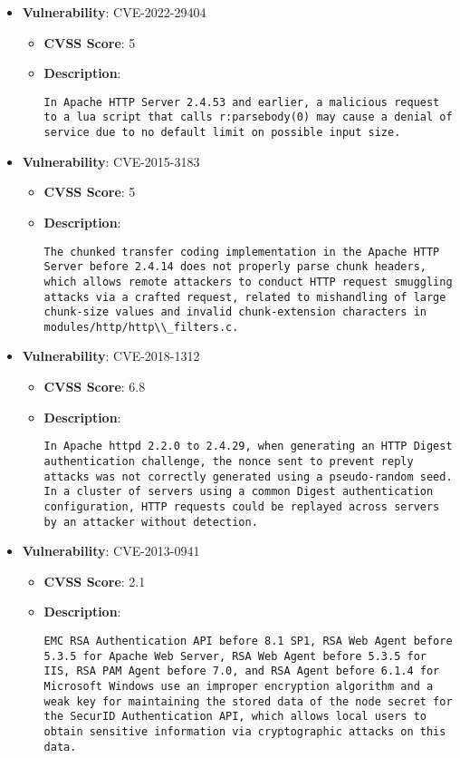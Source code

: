 \documentclass{article}
\begin{document}
\begin{itemize}
        \item \textbf{Vulnerability}: CVE-2022-29404
        \begin{itemize}
            \item \textbf{CVSS Score}:  5 
            \item \textbf{Description}:
            \parbox[t]{0.9\linewidth}{
                \verb|In Apache HTTP Server 2.4.53 and earlier, a malicious request to a lua script that calls r:parsebody(0) may cause a denial of service due to no default limit on possible input size.|
            }
        \end{itemize}
    
        \item \textbf{Vulnerability}: CVE-2015-3183
        \begin{itemize}
            \item \textbf{CVSS Score}:  5 
            \item \textbf{Description}:
            \parbox[t]{0.9\linewidth}{
                \verb|The chunked transfer coding implementation in the Apache HTTP Server before 2.4.14 does not properly parse chunk headers, which allows remote attackers to conduct HTTP request smuggling attacks via a crafted request, related to mishandling of large chunk-size values and invalid chunk-extension characters in modules/http/http\\_filters.c.|
            }
        \end{itemize}
    
        \item \textbf{Vulnerability}: CVE-2018-1312
        \begin{itemize}
            \item \textbf{CVSS Score}:  6.8 
            \item \textbf{Description}:
            \parbox[t]{0.9\linewidth}{
                \verb|In Apache httpd 2.2.0 to 2.4.29, when generating an HTTP Digest authentication challenge, the nonce sent to prevent reply attacks was not correctly generated using a pseudo-random seed. In a cluster of servers using a common Digest authentication configuration, HTTP requests could be replayed across servers by an attacker without detection.|
            }
        \end{itemize}
    
        \item \textbf{Vulnerability}: CVE-2013-0941
        \begin{itemize}
            \item \textbf{CVSS Score}:  2.1 
            \item \textbf{Description}:
            \parbox[t]{0.9\linewidth}{
                \verb|EMC RSA Authentication API before 8.1 SP1, RSA Web Agent before 5.3.5 for Apache Web Server, RSA Web Agent before 5.3.5 for IIS, RSA PAM Agent before 7.0, and RSA Agent before 6.1.4 for Microsoft Windows use an improper encryption algorithm and a weak key for maintaining the stored data of the node secret for the SecurID Authentication API, which allows local users to obtain sensitive information via cryptographic attacks on this data.|
            }
        \end{itemize}
    

\end{itemize}
\end{document}
